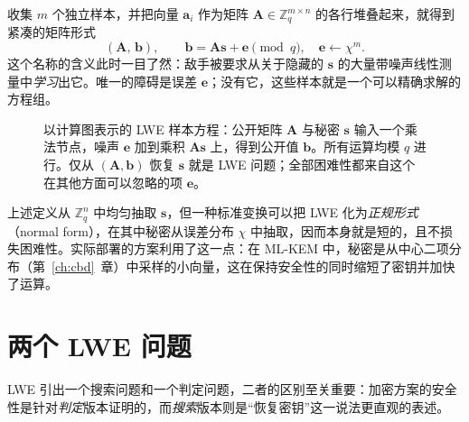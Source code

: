 收集 $m$ 个独立样本，并把向量 $\mathbf{a}_i$ 作为矩阵 $\mathbf{A}\in\mathbb{Z}_q^{m\times n}$ 的各行堆叠起来，就得到紧凑的矩阵形式
\[
(\mathbf{A},\,\mathbf{b}), \qquad \mathbf{b}=\mathbf{A}\mathbf{s}+\mathbf{e}\pmod q,\quad \mathbf{e}\leftarrow\chi^{m}.
\]
这个名称的含义此时一目了然：敌手被要求从关于隐藏的 $\mathbf{s}$ 的大量带噪声线性测量中\emph{学习}出它。唯一的障碍是误差 $\mathbf{e}$；没有它，这些样本就是一个可以精确求解的方程组。

\begin{figure}[H]
\centering
{}
\caption{以计算图表示的 LWE 样本方程：公开矩阵 $\mathbf{A}$ 与秘密 $\mathbf{s}$ 输入一个乘法节点，噪声 $\mathbf{e}$ 加到乘积 $\mathbf{A}\mathbf{s}$ 上，得到公开值 $\mathbf{b}$。所有运算均模 $q$ 进行。仅从 $(\mathbf{A},\mathbf{b})$ 恢复 $\mathbf{s}$ 就是 LWE 问题；全部困难性都来自这个在其他方面可以忽略的项 $\mathbf{e}$。}
\label{fig:lwe-equation-boxes}
\end{figure}

\begin{remark}[关于秘密的分布]
上述定义从 $\mathbb{Z}_q^{n}$ 中均匀抽取 $\mathbf{s}$，但一种标准变换可以把 LWE 化为\emph{正规形式}（normal form），在其中秘密从误差分布 $\chi$ 中抽取，因而本身就是短的，且不损失困难性。实际部署的方案利用了这一点：在 ML-KEM 中，秘密是从中心二项分布（第~\ref{ch:cbd}~章）中采样的小向量，这在保持安全性的同时缩短了密钥并加快了运算。
\end{remark}

\section{两个 LWE 问题}

LWE 引出一个搜索问题和一个判定问题，二者的区别至关重要：加密方案的安全性是针对\emph{判定}版本证明的，而\emph{搜索}版本则是“恢复密钥”这一说法更直观的表述。

